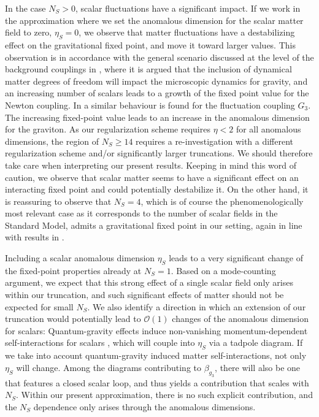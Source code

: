 \documentclass[11pt]{book}
\numberwithin{equation}{chapter}
\begin{document}
In the case $N_S>0$, scalar fluctuations have a significant impact.
If we work in the approximation where we set the anomalous dimension for the scalar matter field to zero,
$\eta_S=0$, we observe that matter fluctuations  have a destabilizing effect on the gravitational fixed point,
and move it toward larger values.
This observation is in accordance with the general scenario discussed at the level of the
background couplings in \cite{Dona:2013qba, Dona:2014pla},
where it is argued that the inclusion of dynamical matter degrees of freedom will impact
the microscopic dynamics for gravity, and an increasing number of scalars leads to a growth of the
fixed point value for the Newton coupling. In \cite{Meibohm:2015twa} a similar behaviour
is found for the fluctuation coupling $G_3$.
The increasing fixed-point value leads to an increase in the anomalous dimension for the graviton.
As our regularization scheme requires $\eta<2$ for all anomalous dimensions,
the region of $N_S \geq 14$ requires a re-investigation with a different regularization
scheme and/or significantly larger truncations.
We should therefore take care when interpreting our present results.
Keeping in mind this word of caution, we observe that scalar matter seems to have a significant
effect on an interacting fixed point and could potentially destabilize it.
On the other hand, it is reassuring to observe that $N_S=4$,
which is of course the phenomenologically most relevant case as it corresponds to the number of
scalar fields in the Standard Model,
admits a gravitational fixed point in our setting,
again in line with results in \cite{Dona:2013qba, Dona:2014pla, Meibohm:2015twa}.

Including a scalar anomalous dimension $\eta_S$ leads to a very significant change
of the fixed-point properties already at $N_S=1$.
Based on a mode-counting argument, we
expect that this strong effect of a single scalar field only arises within our truncation,
and such significant effects of matter should not be expected for small $N_S$.
We also identify a direction in which an extension of our truncation would potentially
lead to $\mathcal{O}(1)$ changes of the anomalous dimension for scalars:
Quantum-gravity effects induce non-vanishing momentum-dependent self-interactions
for scalars \cite{Eichhorn:2012va}, which will couple into $\eta_S$ via a tadpole diagram.
If we take into account quantum-gravity induced matter self-interactions, not only $\eta_S$ will change.
Among the diagrams contributing to $\beta_{g_3}$,
there will also be one that features a closed scalar loop,
and thus yields a contribution that scales with $N_S$. Within our present approximation,
there is no such explicit contribution, and the $N_S$ dependence only arises through the anomalous dimensions.
\end{document}
